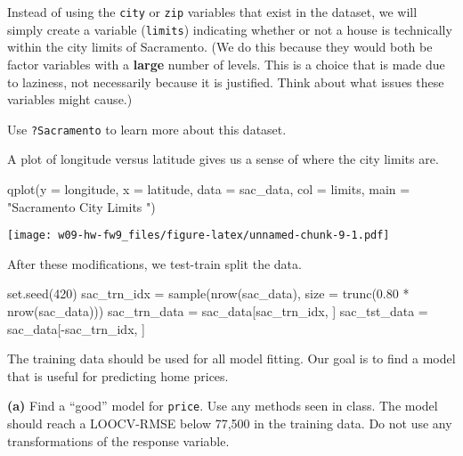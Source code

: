 \documentclass[
]{article}
\newenvironment{Shaded}{\begin{snugshade}}{\end{snugshade}}
\newcommand{\AttributeTok}[1]{\textcolor[rgb]{0.77,0.63,0.00}{#1}}
\newcommand{\DecValTok}[1]{\textcolor[rgb]{0.00,0.00,0.81}{#1}}
\newcommand{\FloatTok}[1]{\textcolor[rgb]{0.00,0.00,0.81}{#1}}
\newcommand{\FunctionTok}[1]{\textcolor[rgb]{0.00,0.00,0.00}{#1}}
\newcommand{\NormalTok}[1]{#1}
\newcommand{\OtherTok}[1]{\textcolor[rgb]{0.56,0.35,0.01}{#1}}
\newcommand{\SpecialCharTok}[1]{\textcolor[rgb]{0.00,0.00,0.00}{#1}}
\newcommand{\StringTok}[1]{\textcolor[rgb]{0.31,0.60,0.02}{#1}}
\begin{document}
Instead of using the \texttt{city} or \texttt{zip} variables that exist
in the dataset, we will simply create a variable (\texttt{limits})
indicating whether or not a house is technically within the city limits
of Sacramento. (We do this because they would both be factor variables
with a \textbf{large} number of levels. This is a choice that is made
due to laziness, not necessarily because it is justified. Think about
what issues these variables might cause.)

Use \texttt{?Sacramento} to learn more about this dataset.

A plot of longitude versus latitude gives us a sense of where the city
limits are.

\begin{Shaded}
\begin{Highlighting}[]
\FunctionTok{qplot}\NormalTok{(}\AttributeTok{y =}\NormalTok{ longitude, }\AttributeTok{x =}\NormalTok{ latitude, }\AttributeTok{data =}\NormalTok{ sac\_data,}
      \AttributeTok{col =}\NormalTok{ limits, }\AttributeTok{main =} \StringTok{"Sacramento City Limits "}\NormalTok{)}
\end{Highlighting}
\end{Shaded}

\texttt{[image: w09-hw-fw9\_files/figure-latex/unnamed-chunk-9-1.pdf]}

After these modifications, we test-train split the data.

\begin{Shaded}
\begin{Highlighting}[]
\FunctionTok{set.seed}\NormalTok{(}\DecValTok{420}\NormalTok{)}
\NormalTok{sac\_trn\_idx  }\OtherTok{=} \FunctionTok{sample}\NormalTok{(}\FunctionTok{nrow}\NormalTok{(sac\_data), }\AttributeTok{size =} \FunctionTok{trunc}\NormalTok{(}\FloatTok{0.80} \SpecialCharTok{*} \FunctionTok{nrow}\NormalTok{(sac\_data)))}
\NormalTok{sac\_trn\_data }\OtherTok{=}\NormalTok{ sac\_data[sac\_trn\_idx, ]}
\NormalTok{sac\_tst\_data }\OtherTok{=}\NormalTok{ sac\_data[}\SpecialCharTok{{-}}\NormalTok{sac\_trn\_idx, ]}
\end{Highlighting}
\end{Shaded}

The training data should be used for all model fitting. Our goal is to
find a model that is useful for predicting home prices.

\textbf{(a)} Find a ``good'' model for \texttt{price}. Use any methods
seen in class. The model should reach a LOOCV-RMSE below 77,500 in the
training data. Do not use any transformations of the response variable.
\end{document}
